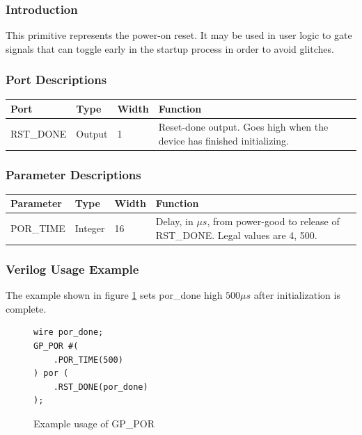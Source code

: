 \documentclass[11pt]{article}
\begin{document}
\subsubsection{Introduction}
This primitive represents the power-on reset. It may be used in user logic to gate signals that can toggle early in the 
startup process in order to avoid glitches.


\subsubsection{Port Descriptions}

\begin{tabularx}{5in}{|l|l|l|X|}
\hline
{\bfseries Port} & {\bfseries Type} & {\bfseries Width} & {\bfseries Function} \\
\hline
RST\_DONE & Output & 1 & Reset-done output. Goes high when the device has finished initializing.\\
\hline
\end{tabularx}

\subsubsection{Parameter Descriptions}

\begin{tabularx}{5in}{|l|l|l|X|}
\hline
{\bfseries Parameter} & {\bfseries Type} & {\bfseries Width} & {\bfseries Function} \\
\hline
POR\_TIME & Integer & 16 & Delay, in $\mu s$, from power-good to release of RST\_DONE. Legal values are 4, 500.\\
\hline
\end{tabularx}

\subsubsection{Verilog Usage Example}

The example shown in figure \ref{gp-por-example} sets por\_done high $500 \mu s$ after initialization is complete.

\begin{figure}[h]
\begin{lstlisting}
wire por_done;
GP_POR #(
	.POR_TIME(500)
) por (
	.RST_DONE(por_done)
);
\end{lstlisting}
\caption{Example usage of GP\_POR}
\label{gp-por-example}
\end{figure}
\end{document}
